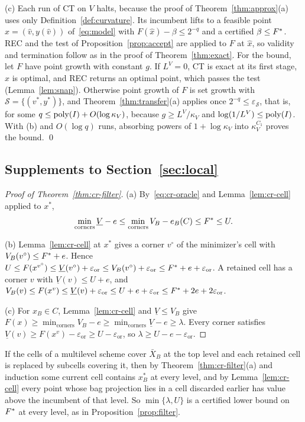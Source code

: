 (c) Each run of CT on $V$ halts, because the proof of
Theorem~\ref{thm:approx}(a) uses only Definition~\ref{def:curvature}. Its
incumbent lifts to a feasible point $\hat x=(\hat v,y(\hat v))$
of~\eqref{eq:model} with $F(\hat x)-\beta\le2^{-q}$ and a certified
$\beta\le F^{*}$. REC and the test of Proposition~\ref{prop:accept} are
applied to $F$ at $\hat x$, so validity and termination follow as in the
proof of Theorem~\ref{thm:exact}. For the bound, let $F$ have point growth
with constant $g$. If $L^V=0$, CT is exact at its first stage, $\hat x$ is
optimal, and REC returns an optimal point, which passes the test
(Lemma~\ref{lem:snap}). Otherwise point growth of $F$ is set growth with
$\mathcal S=\{(v^*,y^*)\}$, and Theorem~\ref{thm:transfer}(a) applies once
$2^{-q}\le\varepsilon_{\mathcal S}$, that is, for some
$q\le\operatorname{poly}(I)+O(\log\kappa_V)$, because $g\ge L^V/\kappa_V$ and
$\log(1/L^V)\le\operatorname{poly}(I)$. With (b) and $O(\log q)$ runs, absorbing powers of
$1+\log\kappa_V$ into $\kappa_V^{C_1}$ proves the bound.
\qed

\subsection{Supplements to Section~\ref{sec:local}}

\begin{proof}[Proof of Theorem~\ref{thm:cr-filter}]
(a) By~\eqref{eq:cr-oracle} and Lemma~\ref{lem:cr-cell} applied to $x^*$,
\[
\min_{\text{corners}}\underline V-e\le\min_{\text{corners}}V_B-e_B(C)\le F^{*}\le U.
\]

(b) Lemma~\ref{lem:cr-cell} at $x^*$ gives a corner $v^\circ$ of the
minimizer's cell with $V_B(v^\circ)\le F^{*}+e$. Hence
$U\le F(x^{v^\circ})\le\underline V(v^\circ)+\varepsilon_{\mathrm{or}}\le V_B(v^\circ)+\varepsilon_{\mathrm{or}}\le F^{*}+e+\varepsilon_{\mathrm{or}}$.
A retained cell has a corner $v$ with $\underline V(v)\le U+e$, and
$V_B(v)\le F(x^v)\le\underline V(v)+\varepsilon_{\mathrm{or}}\le U+e+\varepsilon_{\mathrm{or}}\le F^{*}+2e+2\varepsilon_{\mathrm{or}}$.

(c) For $x_B\in C$, Lemma~\ref{lem:cr-cell} and $\underline V\le V_B$ give
$F(x)\ge\min_{\text{corners}}V_B-e\ge\min_{\text{corners}}\underline V-e\ge\lambda$.
Every corner satisfies $\underline V(v)\ge F(x^v)-\varepsilon_{\mathrm{or}}\ge U-\varepsilon_{\mathrm{or}}$, so
$\lambda\ge U-e-\varepsilon_{\mathrm{or}}$.
\end{proof}

If the cells of a multilevel scheme cover $\bar X_B$ at the top level and
each retained cell is replaced by subcells covering it, then by
Theorem~\ref{thm:cr-filter}(a) and induction some current cell contains $x^*_B$ at every level, and by
Lemma~\ref{lem:cr-cell} every point whose bag projection lies in a cell
discarded earlier has value above the incumbent of that level. So
$\min\{\lambda,U\}$ is a certified lower bound on $F^{*}$ at every level, as
in Proposition~\ref{prop:filter}.

